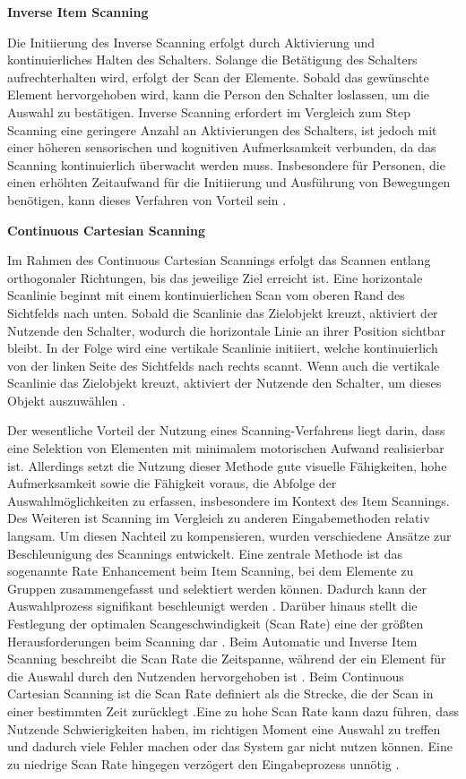 {\normalfont \bfseries Inverse Item Scanning} 

Die Initiierung des Inverse Scanning erfolgt durch Aktivierung und kontinuierliches Halten des Schalters. Solange die Betätigung des Schalters aufrechterhalten wird, erfolgt der Scan der Elemente. Sobald das gewünschte Element hervorgehoben wird, kann die Person den Schalter loslassen, um die Auswahl zu bestätigen. Inverse Scanning erfordert im Vergleich zum Step Scanning eine geringere Anzahl an Aktivierungen des Schalters, ist jedoch mit einer höheren sensorischen und kognitiven Aufmerksamkeit verbunden, da das Scanning kontinuierlich überwacht werden muss. Insbesondere für Personen, die einen erhöhten Zeitaufwand für die Initiierung und Ausführung von Bewegungen benötigen, kann dieses Verfahren von Vorteil sein \citep{COOK2015117}. 

{\normalfont \bfseries Continuous Cartesian Scanning}

Im Rahmen des Continuous Cartesian Scannings erfolgt das Scannen entlang orthogonaler Richtungen, bis das jeweilige Ziel erreicht ist. Eine horizontale Scanlinie beginnt mit einem kontinuierlichen Scan vom oberen Rand des Sichtfelds nach unten. Sobald die Scanlinie das Zielobjekt kreuzt, aktiviert der Nutzende den Schalter, wodurch die horizontale Linie an ihrer Position sichtbar bleibt. In der Folge wird eine vertikale Scanlinie initiiert, welche kontinuierlich von der linken Seite des Sichtfelds nach rechts scannt. Wenn auch die vertikale Scanlinie das Zielobjekt kreuzt, aktiviert der Nutzende den Schalter, um dieses Objekt auszuwählen \citep{Blackstien-Adler30062004}.

Der wesentliche Vorteil der Nutzung eines Scanning-Verfahrens liegt darin, dass eine Selektion von Elementen mit minimalem motorischen Aufwand realisierbar ist. Allerdings setzt die Nutzung dieser Methode gute visuelle Fähigkeiten, hohe Aufmerksamkeit sowie die Fähigkeit voraus, die Abfolge der Auswahlmöglichkeiten zu erfassen, insbesondere im Kontext des Item Scannings. Des Weiteren ist Scanning im Vergleich zu anderen Eingabemethoden relativ langsam. Um diesen Nachteil zu kompensieren, wurden verschiedene Ansätze zur Beschleunigung des Scannings entwickelt. Eine zentrale Methode ist das sogenannte Rate Enhancement beim Item Scanning, bei dem Elemente zu Gruppen zusammengefasst und selektiert werden können. Dadurch kann der Auswahlprozess signifikant beschleunigt werden \citep{COOK2015117}. 
Darüber hinaus stellt die Festlegung der optimalen Scangeschwindigkeit (Scan Rate) eine der größten Herausforderungen beim Scanning dar \citep{COOK2015117}. Beim Automatic und Inverse Item Scanning beschreibt die Scan Rate die Zeitspanne, während der ein Element für die Auswahl durch den Nutzenden hervorgehoben ist \citep{Simpson30062007}. Beim Continuous Cartesian Scanning ist die Scan Rate definiert als die Strecke, die der Scan in einer bestimmten Zeit zurücklegt \citep{Blackstien-Adler30062004}.Eine zu hohe Scan Rate kann dazu führen, dass Nutzende Schwierigkeiten haben, im richtigen Moment eine Auswahl zu treffen und dadurch viele Fehler machen oder das System gar nicht nutzen können. Eine zu niedrige Scan Rate hingegen verzögert den Eingabeprozess unnötig \citep{Simpson30062007}.  

